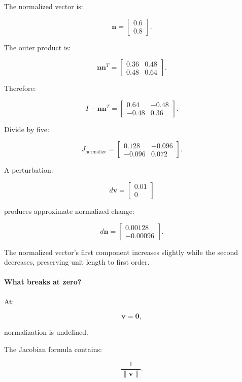 The normalized vector is:

\[
\mathbf n= \begin{bmatrix} 0.6\\0.8 \end{bmatrix}.
\]

The outer product is:

\[
\mathbf n\mathbf n^T= \begin{bmatrix} 0.36&0.48\\ 0.48&0.64 \end{bmatrix}.
\]

Therefore:

\[
I-\mathbf n\mathbf n^T= \begin{bmatrix} 0.64&-0.48\\ -0.48&0.36 \end{bmatrix}.
\]

Divide by five:

\[
\boxed{ J_{\mathrm{normalize}}= \begin{bmatrix} 0.128&-0.096\\ -0.096&0.072 \end{bmatrix} }.
\]

A perturbation:

\[
d\mathbf v= \begin{bmatrix} 0.01\\0 \end{bmatrix}
\]

produces approximate normalized change:

\[
d\mathbf n = \begin{bmatrix} 0.00128\\-0.00096 \end{bmatrix}.
\]

The normalized vector's first component increases slightly while the second decreases, preserving unit length to first order.

\paragraph{What breaks at zero?}\label{02-foundations-ii-ch027-what-breaks-at-zero}

\hypertarget{02-foundations-ii-ch027-what-breaks-at-zero}{}

At:

\[
\mathbf v=\mathbf0,
\]

normalization is undefined.

The Jacobian formula contains:

\[
\frac1{\|\mathbf v\|}.
\]

